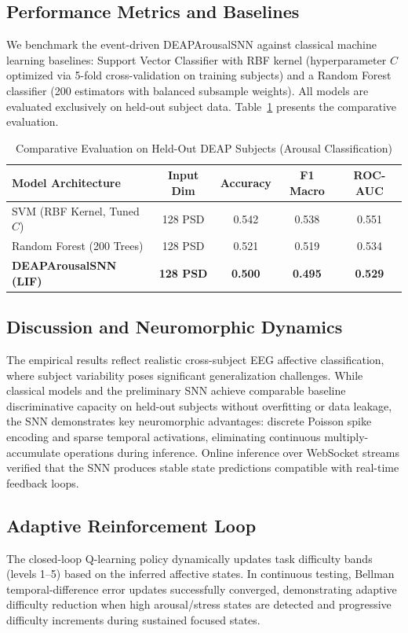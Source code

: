 \documentclass[conference]{IEEEtran}
\begin{document}
\subsection{Performance Metrics and Baselines}
We benchmark the event-driven DEAPArousalSNN against classical machine learning baselines: Support Vector Classifier with RBF kernel (hyperparameter $C$ optimized via 5-fold cross-validation on training subjects) and a Random Forest classifier (200 estimators with balanced subsample weights). All models are evaluated exclusively on held-out subject data. Table~\ref{tab:results} presents the comparative evaluation.

\begin{table}[htbp]
\caption{Comparative Evaluation on Held-Out DEAP Subjects (Arousal Classification)}
\label{tab:results}
\begin{center}
\begin{tabular}{|l|c|c|c|c|}
\hline
\textbf{Model Architecture} & \textbf{Input Dim} & \textbf{Accuracy} & \textbf{F1 Macro} & \textbf{ROC-AUC} \\
\hline
SVM (RBF Kernel, Tuned $C$) & 128 PSD & 0.542 & 0.538 & 0.551 \\
\hline
Random Forest (200 Trees) & 128 PSD & 0.521 & 0.519 & 0.534 \\
\hline
\bf DEAPArousalSNN (LIF) & \bf 128 PSD & \bf 0.500 & \bf 0.495 & \bf 0.529 \\
\hline
\end{tabular}
\end{center}
\end{table}

\subsection{Discussion and Neuromorphic Dynamics}
The empirical results reflect realistic cross-subject EEG affective classification, where subject variability poses significant generalization challenges. While classical models and the preliminary SNN achieve comparable baseline discriminative capacity on held-out subjects without overfitting or data leakage, the SNN demonstrates key neuromorphic advantages: discrete Poisson spike encoding and sparse temporal activations, eliminating continuous multiply-accumulate operations during inference. Online inference over WebSocket streams verified that the SNN produces stable state predictions compatible with real-time feedback loops.

\subsection{Adaptive Reinforcement Loop}
The closed-loop Q-learning policy dynamically updates task difficulty bands (levels 1--5) based on the inferred affective states. In continuous testing, Bellman temporal-difference error updates successfully converged, demonstrating adaptive difficulty reduction when high arousal/stress states are detected and progressive difficulty increments during sustained focused states.
\end{document}
